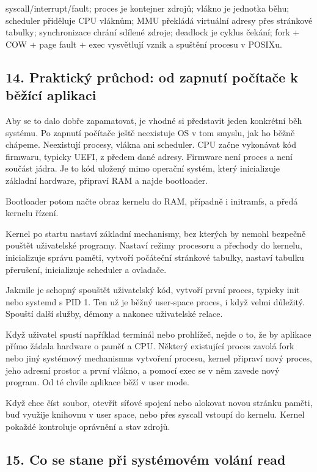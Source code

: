 syscall/interrupt/fault; proces je kontejner zdrojů; vlákno je jednotka běhu; scheduler přiděluje CPU vláknům; MMU překládá virtuální adresy přes stránkové tabulky; synchronizace chrání sdílené zdroje; deadlock je cyklus čekání; fork + COW + page fault + exec vysvětlují vznik a spuštění procesu v POSIXu.

\subsection*{14. Praktický průchod: od zapnutí počítače k běžící aplikaci}

Aby se to dalo dobře zapamatovat, je vhodné si představit jeden konkrétní běh systému. Po zapnutí počítače ještě neexistuje OS v tom smyslu, jak ho běžně chápeme. Neexistují procesy, vlákna ani scheduler. CPU začne vykonávat kód firmwaru, typicky UEFI, z předem dané adresy. Firmware není proces a není součást jádra. Je to kód uložený mimo operační systém, který inicializuje základní hardware, připraví RAM a najde bootloader.

Bootloader potom načte obraz kernelu do RAM, případně i initramfs, a předá kernelu řízení.

Kernel po startu nastaví základní mechanismy, bez kterých by nemohl bezpečně pouštět uživatelské programy. Nastaví režimy procesoru a přechody do kernelu, inicializuje správu paměti, vytvoří počáteční stránkové tabulky, nastaví tabulku přerušení, inicializuje scheduler a ovladače.

Jakmile je schopný spouštět uživatelský kód, vytvoří první proces, typicky init nebo systemd s PID 1. Ten už je běžný user-space proces, i když velmi důležitý. Spouští další služby, démony a nakonec uživatelské relace.

Když uživatel spustí například terminál nebo prohlížeč, nejde o to, že by aplikace přímo žádala hardware o paměť a CPU. Některý existující proces zavolá fork nebo jiný systémový mechanismus vytvoření procesu, kernel připraví nový proces, jeho adresní prostor a první vlákno, a pomocí exec se v něm zavede nový program. Od té chvíle aplikace běží v user mode.

Když chce číst soubor, otevřít síťové spojení nebo alokovat novou stránku paměti, buď využije knihovnu v user space, nebo přes syscall vstoupí do kernelu. Kernel pokaždé kontroluje oprávnění a stav zdrojů.

\subsection*{15. Co se stane při systémovém volání read}

